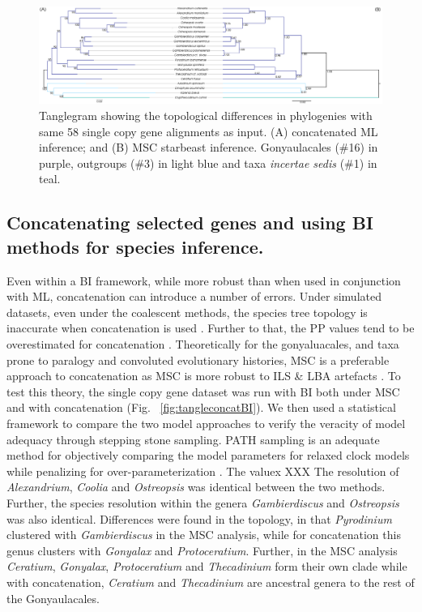 \documentclass[12pt]{article}
\begin{document}
\begin{figure} 
\includegraphics[scale=.2]{figures/MSC-BI_vs_singlecopy-concat-ML.png} 
\caption{Tanglegram showing the topological differences in phylogenies with same 58 single copy gene alignments as input. (A) concatenated ML inference; and (B) MSC starbeast inference. Gonyaulacales (\#16) in purple, outgroups (\#3) in light blue and taxa \textit{incertae sedis} (\#1) in teal.} 
\label{fig:tangleconcatML}
\end{figure} 
\FloatBarrier

\subsection*{Concatenating selected genes and using BI methods for species inference.}
\FloatBarrier
Even within a BI framework, while more robust than when used in conjunction with ML, concatenation can introduce a number of errors. 
Under simulated datasets, even under the coalescent methods, the species tree topology is inaccurate when concatenation is used \cite{kubatko2007inconsistency}. 
Further to that, the PP values tend to be overestimated for concatenation \cite{suzuki2002overcredibility}. 
Theoretically for the gonyaluacales, and taxa prone to paralogy and convoluted evolutionary histories, MSC is a preferable approach to concatenation as MSC is more robust to ILS \& LBA artefacts \cite{liu2014coalescent}. 
To test this theory, the single copy gene dataset was run with BI both under MSC and with concatenation (Fig. ~\ref{fig:tangleconcatBI}). 
We then used a statistical framework to compare the two model approaches to verify the veracity of model adequacy through stepping stone sampling. 
PATH sampling is an adequate method for objectively comparing the model parameters for relaxed clock models while penalizing for over-parameterization \cite{baele2012accurate}. %
The valuex XXX %
The resolution of \textit{Alexandrium}, \textit{Coolia} and \textit{Ostreopsis} was identical between the two methods. 
Further, the species resolution within the genera \textit{Gambierdiscus} and \textit{Ostreopsis} was also identical. 
Differences were found in the topology, in that \textit{Pyrodinium} clustered with \textit{Gambierdiscus} in the MSC analysis, while for concatenation this genus clusters with \textit{Gonyalax} and \textit{Protoceratium}. 
Further, in the MSC analysis \textit{Ceratium}, \textit{Gonyalax}, \textit{Protoceratium} and \textit{Thecadinium} form their own clade while with concatenation, \textit{Ceratium} and \textit{Thecadinium} are ancestral genera to the rest of the Gonyaulacales. 
\end{document}
